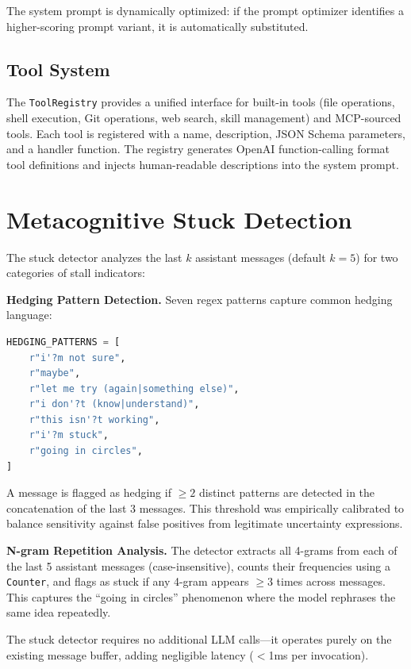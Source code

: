 \documentclass[conference]{IEEEtran}
\begin{document}
The system prompt is dynamically optimized: if the prompt optimizer identifies a higher-scoring prompt variant, it is automatically substituted.

\subsection{Tool System}

The \texttt{ToolRegistry} provides a unified interface for built-in tools (file operations, shell execution, Git operations, web search, skill management) and MCP-sourced tools. Each tool is registered with a name, description, JSON Schema parameters, and a handler function. The registry generates OpenAI function-calling format tool definitions and injects human-readable descriptions into the system prompt.

\section{Metacognitive Stuck Detection}
\label{sec:stuck}

The stuck detector analyzes the last $k$ assistant messages (default $k{=}5$) for two categories of stall indicators:

\textbf{Hedging Pattern Detection.} Seven regex patterns capture common hedging language:

\begin{lstlisting}[language=Python, caption={Hedging patterns for stuck detection.}]
HEDGING_PATTERNS = [
    r"i'?m not sure",
    r"maybe",
    r"let me try (again|something else)",
    r"i don'?t (know|understand)",
    r"this isn'?t working",
    r"i'?m stuck",
    r"going in circles",
]
\end{lstlisting}

A message is flagged as hedging if $\geq 2$ distinct patterns are detected in the concatenation of the last 3 messages. This threshold was empirically calibrated to balance sensitivity against false positives from legitimate uncertainty expressions.

\textbf{N-gram Repetition Analysis.} The detector extracts all 4-grams from each of the last 5 assistant messages (case-insensitive), counts their frequencies using a \texttt{Counter}, and flags as stuck if any 4-gram appears $\geq 3$ times across messages. This captures the ``going in circles'' phenomenon where the model rephrases the same idea repeatedly.

The stuck detector requires no additional LLM calls---it operates purely on the existing message buffer, adding negligible latency ($<$1ms per invocation).
\end{document}
